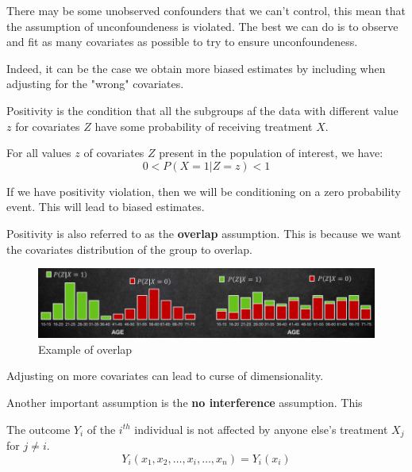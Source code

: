 There may be some unobserved confounders that we can't control, this mean that
the assumption of unconfoundeness is violated. The best we can do is to observe
and fit as many covariates as possible to try to ensure unconfoundeness.

Indeed, it can be the case we obtain more biased estimates by including when
adjusting for the "wrong" covariates.

\begin{definition}[Positivity]
    Positivity is the condition that all the subgroups af the data with different
    value $z$ for covariates $Z$ have some probability of receiving treatment $X$.

    For all values $z$ of covariates $Z$ present in the population of interest,
    we have:
    \begin{equation}
        0 < P(X = 1 | Z = z) < 1
    \end{equation}
\end{definition}

If we have positivity violation, then we will be conditioning on a zero probability
event. This will lead to biased estimates.

Positivity is also referred to as the \textbf{overlap} assumption. This is because
we want the covariates distribution of the group to overlap.

\begin{figure}[!ht]
    \centering
    \includegraphics[width=\textwidth]{img/overlap.png}
    \caption{Example of overlap}
    \label{fig:positivity}
\end{figure}

Adjusting on more covariates can lead to curse of dimensionality. 

Another important assumption is the \textbf{no interference} assumption. This
\begin{definition}[No interference]
    The outcome $Y_i$ of the $i^{th}$ individual is not affected by anyone else's
    treatment $X_j$ for $j \neq i$.
    \begin{equation}
        Y_i(x_1, x_2, \ldots, x_i, \ldots, x_n) = Y_i(x_i)
    \end{equation}
\end{definition}

